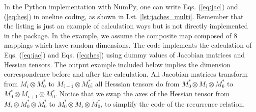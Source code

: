 \documentclass[a4paper]{article}
\begin{document}
In the Python implementation with NumPy, one can write Eqs. (\ref{eq:jac}) and (\ref{eq:hes})
in oneline coding, as shown in Lst. \ref{lst:jaches_multi}.
Remember that the listing is just an example of calculation ways
but is not directly implemented in the package.
In the example, we assume the composite map composed of 8 mappings which have random dimensions.
The code implements the calculation of Eqs. (\ref{eq:jac}) and Eqs. (\ref{eq:hes})
using dummy values of Jacobian matrices and Hessian tensors.
The output example included below implies the dimension correspondence
before and after the calculation.
All Jacobian matrices transform from $M_i \otimes M_0^*$ to $M_{i+1} \otimes M_0^*$;
all Hesssian tensors do from $M_0^* \otimes M_{i} \otimes M_0^*$ to
$M_0^* \otimes M_{i+1} \otimes M_0^*$.
Notice that we swap the axes of the Hessian tensor from $M_{i} \otimes M_0^* \otimes M_0^*$
to $M_0^* \otimes M_{i} \otimes M_0^*$, to simplify the code of the recurrence relation.
\begin{center}
    
\end{center}


\clearpage
\end{document}
